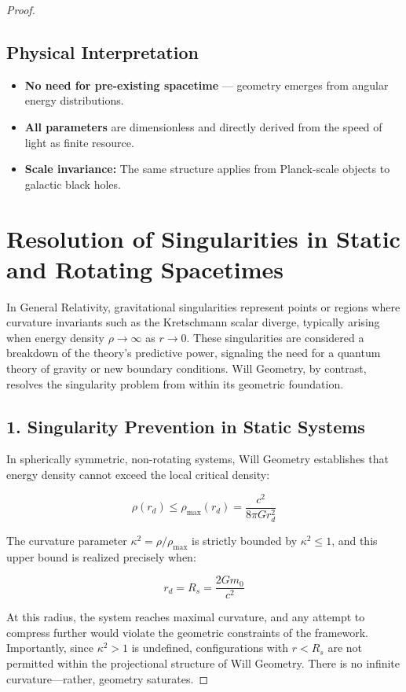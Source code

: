 \documentclass{article}
\begin{document}
\begin{proof}
\subsection*{Physical Interpretation}

\begin{itemize}
  \item \textbf{No need for pre-existing spacetime} — geometry emerges from angular energy distributions.
  \item \textbf{All parameters} are dimensionless and directly derived from the speed of light as finite resource.
  \item \textbf{Scale invariance:} The same structure applies from Planck-scale objects to galactic black holes.
\end{itemize}

\section{Resolution of Singularities in Static and Rotating Spacetimes}

In General Relativity, gravitational singularities represent points or regions where curvature invariants such as the Kretschmann scalar diverge, typically arising when energy density \( \rho \to \infty \) as \( r \to 0 \). These singularities are considered a breakdown of the theory’s predictive power, signaling the need for a quantum theory of gravity or new boundary conditions. Will Geometry, by contrast, resolves the singularity problem from within its geometric foundation.

\subsection*{1. Singularity Prevention in Static Systems}

In spherically symmetric, non-rotating systems, Will Geometry establishes that energy density cannot exceed the local critical density:

\[
\rho(r_{d}) \leq \rho_{\text{max}}(r_{d}) = \frac{c^2}{8\pi G r_{d}^2}
\]

The curvature parameter \( \kappa^2 = \rho / \rho_{\text{max}} \) is strictly bounded by \( \kappa^2 \leq 1 \), and this upper bound is realized precisely when:

\[
r_{d}= R_s = \frac{2Gm_0}{c^2}
\]

At this radius, the system reaches maximal curvature, and any attempt to compress further would violate the geometric constraints of the framework. Importantly, since \( \kappa^2 > 1 \) is undefined, configurations with \( r < R_s \) are not permitted within the projectional structure of Will Geometry. There is no infinite curvature—rather, geometry saturates.


\end{proof}
\end{document}
